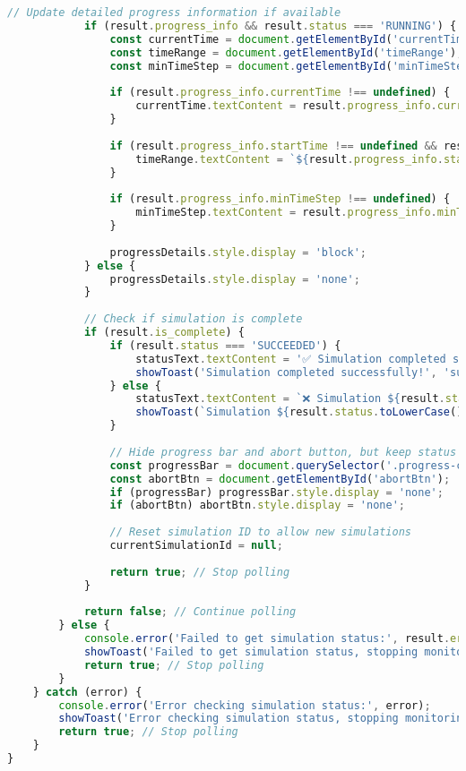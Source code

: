 \documentclass[12pt,a4paper]{article}
\begin{document}
\begin{lstlisting}[language=JavaScript, caption=Simulation Monitoring System]
            // Update detailed progress information if available
            if (result.progress_info && result.status === 'RUNNING') {
                const currentTime = document.getElementById('currentTime');
                const timeRange = document.getElementById('timeRange');
                const minTimeStep = document.getElementById('minTimeStep');
                
                if (result.progress_info.currentTime !== undefined) {
                    currentTime.textContent = result.progress_info.currentTime.toFixed(1);
                }
                
                if (result.progress_info.startTime !== undefined && result.progress_info.stopTime !== undefined) {
                    timeRange.textContent = `${result.progress_info.startTime.toFixed(1)} - ${result.progress_info.stopTime.toFixed(1)}`;
                }
                
                if (result.progress_info.minTimeStep !== undefined) {
                    minTimeStep.textContent = result.progress_info.minTimeStep.toExponential(1);
                }
                
                progressDetails.style.display = 'block';
            } else {
                progressDetails.style.display = 'none';
            }
            
            // Check if simulation is complete
            if (result.is_complete) {
                if (result.status === 'SUCCEEDED') {
                    statusText.textContent = '✅ Simulation completed successfully!';
                    showToast('Simulation completed successfully!', 'success');
                } else {
                    statusText.textContent = `❌ Simulation ${result.status.toLowerCase()}`;
                    showToast(`Simulation ${result.status.toLowerCase()}`, 'error');
                }
                
                // Hide progress bar and abort button, but keep status message
                const progressBar = document.querySelector('.progress-container');
                const abortBtn = document.getElementById('abortBtn');
                if (progressBar) progressBar.style.display = 'none';
                if (abortBtn) abortBtn.style.display = 'none';
                
                // Reset simulation ID to allow new simulations
                currentSimulationId = null;
                
                return true; // Stop polling
            }
            
            return false; // Continue polling
        } else {
            console.error('Failed to get simulation status:', result.error);
            showToast('Failed to get simulation status, stopping monitoring', 'error');
            return true; // Stop polling
        }
    } catch (error) {
        console.error('Error checking simulation status:', error);
        showToast('Error checking simulation status, stopping monitoring', 'error');
        return true; // Stop polling
    }
}
\end{lstlisting}
\end{document}
